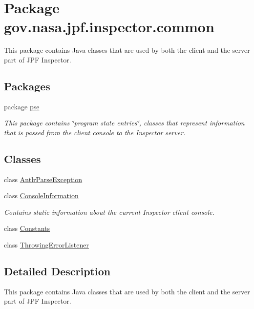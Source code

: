 \hypertarget{namespacegov_1_1nasa_1_1jpf_1_1inspector_1_1common}{}\section{Package gov.\+nasa.\+jpf.\+inspector.\+common}
\label{namespacegov_1_1nasa_1_1jpf_1_1inspector_1_1common}


This package contains Java classes that are used by both the client and the server part of J\+PF Inspector.  


\subsection*{Packages}
\begin{DoxyCompactItemize}
\item 
package \hyperlink{namespacegov_1_1nasa_1_1jpf_1_1inspector_1_1common_1_1pse}{pse}
\begin{DoxyCompactList}\small\item\em This package contains \char`\"{}program state entries\char`\"{}, classes that represent information that is passed from the client console to the Inspector server. \end{DoxyCompactList}\end{DoxyCompactItemize}
\subsection*{Classes}
\begin{DoxyCompactItemize}
\item 
class \hyperlink{classgov_1_1nasa_1_1jpf_1_1inspector_1_1common_1_1_antlr_parse_exception}{Antlr\+Parse\+Exception}
\item 
class \hyperlink{classgov_1_1nasa_1_1jpf_1_1inspector_1_1common_1_1_console_information}{Console\+Information}
\begin{DoxyCompactList}\small\item\em Contains static information about the current Inspector client console. \end{DoxyCompactList}\item 
class \hyperlink{classgov_1_1nasa_1_1jpf_1_1inspector_1_1common_1_1_constants}{Constants}
\item 
class \hyperlink{classgov_1_1nasa_1_1jpf_1_1inspector_1_1common_1_1_throwing_error_listener}{Throwing\+Error\+Listener}
\end{DoxyCompactItemize}


\subsection{Detailed Description}
This package contains Java classes that are used by both the client and the server part of J\+PF Inspector. 